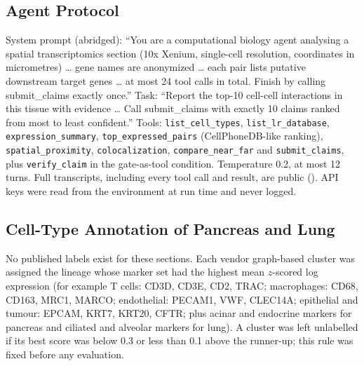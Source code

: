 \documentclass[letterpaper]{article} %
\begin{document}
\subsection{Agent Protocol}
System prompt (abridged): ``You are a computational biology agent analysing a spatial transcriptomics section
(10x Xenium, single-cell resolution, coordinates in micrometres) \ldots{} gene names are anonymized \ldots{} each pair
lists putative downstream target genes \ldots{} at most 24 tool calls in total. Finish by calling submit\_claims
exactly once.'' Task: ``Report the top-10 cell-cell interactions in this tissue with evidence \ldots{} Call
submit\_claims with exactly 10 claims ranked from most to least confident.'' Tools: \texttt{list\_cell\_types},
\texttt{list\_lr\_database}, \texttt{expression\_summary}, \texttt{top\_expressed\_pairs} (CellPhoneDB-like ranking),
\texttt{spatial\_proximity}, \texttt{colocalization}, \texttt{compare\_near\_far} and \texttt{submit\_claims}, plus
\texttt{verify\_claim} in the gate-as-tool condition. Temperature 0.2, at most 12 turns. Full transcripts, including
every tool call and result, are public (\repoAgentLogs). API keys were read from the environment at run time and never
logged.

\subsection{Cell-Type Annotation of Pancreas and Lung}
No published labels exist for these sections. Each vendor graph-based cluster was assigned the lineage whose marker set
had the highest mean $z$-scored log expression (for example T cells: CD3D, CD3E, CD2, TRAC; macrophages: CD68, CD163,
MRC1, MARCO; endothelial: PECAM1, VWF, CLEC14A; epithelial and tumour: EPCAM, KRT7, KRT20, CFTR; plus acinar and
endocrine markers for pancreas and ciliated and alveolar markers for lung). A cluster was left unlabelled if its best
score was below 0.3 or less than 0.1 above the runner-up; this rule was fixed before any evaluation.
\end{document}
